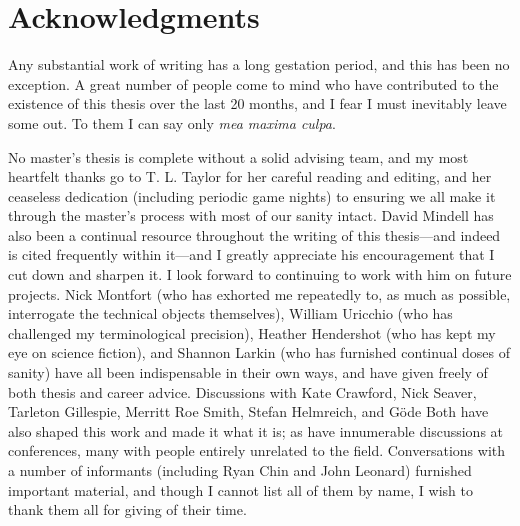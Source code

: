
\cleardoublepage
\setcounter{savepage}{\thepage}
\begin{abstractpage}

\end{abstractpage}

% 

\cleardoublepage

\section*{Acknowledgments}

Any substantial work of writing has a long gestation period, and this
has been no exception. A great number of people come to mind who have
contributed to the existence of this thesis over the last 20 months,
and I fear I must 
inevitably leave some out. To them I can say only \emph{mea maxima culpa}. 

No master's thesis is complete without a
solid advising team, and my most heartfelt thanks go to T. L. Taylor
for her careful reading and editing, and her ceaseless dedication (including periodic
game nights) to ensuring we all make it through the master's process with most of our
sanity intact. David Mindell has also been a continual resource
throughout the writing of this thesis---and indeed is cited frequently
within it---and I greatly appreciate his encouragement that I cut down
and sharpen it. I look forward to continuing to work with him on
future projects. Nick Montfort (who has exhorted me repeatedly to, as
much as possible, interrogate the technical objects themselves),
William Uricchio (who has challenged my terminological precision),
Heather Hendershot (who has kept my eye on science fiction), and
Shannon Larkin (who has furnished continual doses of sanity) have all
been indispensable in their own ways, and have given freely of both
thesis and career advice. Discussions with Kate Crawford, Nick Seaver,
Tarleton Gillespie, Merritt Roe Smith, Stefan Helmreich, and G\"{o}de Both have also
shaped this work and made it what it is; as have innumerable
discussions at conferences, many with people entirely unrelated to the
field. Conversations with a number of informants
(including Ryan Chin and John Leonard)
furnished important material, and though I cannot list all of them by
name, I wish to thank them all for giving of their time.

